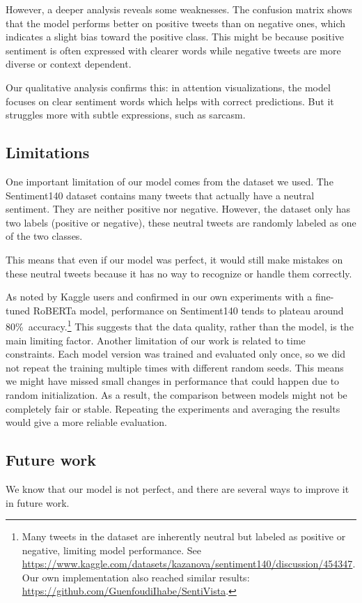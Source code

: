 \documentclass[twocolumn,superscriptaddress,aps]{revtex4-1}
\begin{document}
However, a deeper analysis reveals some weaknesses. The confusion matrix shows that the model performs better on positive tweets than on negative ones, which indicates a slight bias toward the positive class. This might be because positive sentiment is often expressed with clearer words while negative tweets are more diverse or context dependent.

Our qualitative analysis confirms this: in attention visualizations, the model focuses on clear sentiment words which helps with correct predictions. But it struggles more with subtle expressions, such as sarcasm.

\subsection{Limitations}\label{section:limitations}
One important limitation of our model comes from the dataset we used. The Sentiment140 dataset contains many tweets that actually have a neutral sentiment. They are neither positive nor negative. However, the dataset only has two labels (positive or negative), these neutral tweets are randomly labeled as one of the two classes.

This means that even if our model was perfect, it would still make mistakes on these neutral tweets because it has no way to recognize or handle them correctly.

As noted by Kaggle users and confirmed in our own experiments with a fine-tuned RoBERTa model, performance on Sentiment140 tends to plateau around 80\%\ accuracy.\footnote{Many tweets in the dataset are inherently neutral but labeled as positive or negative, limiting model performance. See \url{https://www.kaggle.com/datasets/kazanova/sentiment140/discussion/454347}. Our own implementation also reached similar results: \url{https://github.com/GuenfoudiIhabe/SentiVista}.} This suggests that the data quality, rather than the model, is the main limiting factor.
Another limitation of our work is related to time constraints. Each model version was trained and evaluated only once, so we did not repeat the training multiple times with different random seeds. This means we might have missed small changes in performance that could happen due to random initialization. As a result, the comparison between models might not be completely fair or stable. Repeating the experiments and averaging the results would give a more reliable evaluation.

\subsection{Future work}
We know that our model is not perfect, and there are several ways to improve it in future work.
\end{document}
